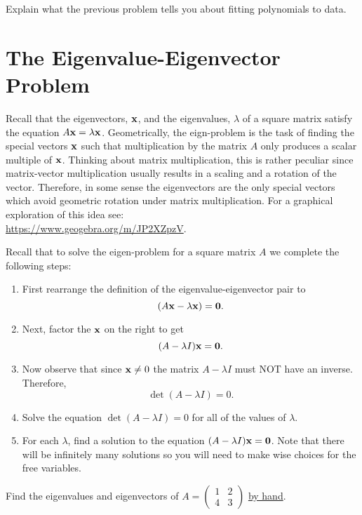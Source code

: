 \begin{problem}
    Explain what the previous problem tells you about fitting polynomials to data.
\end{problem}




\newpage\section{The Eigenvalue-Eigenvector Problem}
Recall that the eigenvectors, ${\bf x}$, and the eigenvalues, $\lambda$ of a square matrix
satisfy the equation $A{\bf x}=\lambda {\bf x}$. Geometrically, the eign-problem is the task of
finding the special vectors ${\bf x}$ such that multiplication by the matrix $A$ only produces
a scalar multiple of ${\bf x}$. Thinking about matrix multiplication, this is rather peculiar
since matrix-vector multiplication usually results in a scaling and a rotation of the
vector. Therefore, in some sense the eigenvectors are the only special vectors which avoid
geometric rotation under matrix multiplication.  For a graphical exploration of this idea
see:\\ \href{https://www.geogebra.org/m/JP2XZpzV}{https://www.geogebra.org/m/JP2XZpzV}.

Recall that to solve the eigen-problem for a square matrix $A$ we complete the following
steps:
\begin{enumerate}
    \item First rearrange the definition of the eigenvalue-eigenvector pair to 
        \[ (A{\bf x}-\lambda {\bf x})={\bf 0}. \]
    \item Next, factor the ${\bf x}$ on the right to get 
        \[ (A-\lambda I) {\bf x}={\bf 0}. \]
    \item Now observe that since ${\bf x} \ne 0$ the matrix $A-\lambda I$ must NOT have an inverse. Therefore,
        \[ \det(A-\lambda I)=0. \]
    \item Solve the equation $\det(A-\lambda I)=0$ for all of the values of $\lambda$.
    \item For each $\lambda$, find a solution to the equation $(A-\lambda I) {\bf x}={\bf 0}$.
        Note that there will be infinitely many solutions so you will need to make wise
        choices for the free variables.
\end{enumerate}
\begin{problem}
    Find the eigenvalues and eigenvectors of $A = \begin{pmatrix} 1 & 2 \\ 4 & 3
    \end{pmatrix}$ \underline{by hand}.
\end{problem}

